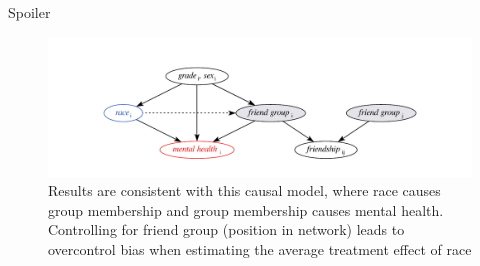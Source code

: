 \documentclass{beamer}
\theoremstyle{remark}
\begin{document}
\begin{frame}{Spoiler}

    \begin{figure}
        \centering
        \includegraphics[width=\textwidth]{figures/addhealth-dag.pdf}
        \caption{Results are consistent with this causal model, where race causes group membership and group membership causes mental health. Controlling for friend group (position in network) leads to overcontrol bias when estimating the average treatment effect of race}
        \label{fig:addhealth-dag}
    \end{figure}


\end{frame}
\end{document}
